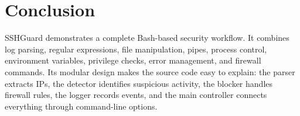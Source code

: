 \documentclass[12pt,a4paper]{article}
\begin{document}
\section{Conclusion}

SSHGuard demonstrates a complete Bash-based security workflow. It combines log parsing,
regular expressions, file manipulation, pipes, process control, environment variables,
privilege checks, error management, and firewall commands. Its modular design makes the
source code easy to explain: the parser extracts IPs, the detector identifies suspicious
activity, the blocker handles firewall rules, the logger records events, and the main
controller connects everything through command-line options.
\end{document}
